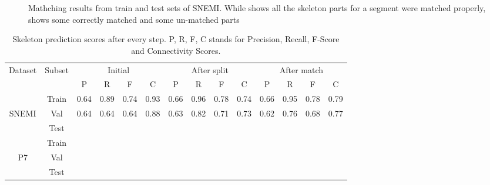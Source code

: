\begin{figure}[htpb]
\begin{subfigure}[b]{0.4\textwidth}
		\caption{\label{fig:merged_val}}
	\end{subfigure}	
	\caption{Mathching results from  train and  test sets of SNEMI. While  shows all the skeleton parts for a segment were matched properly,  shows some correctly matched and some un-matched parts}  
	\label{fig:matchedSNEMI}
\end{figure}

\begin{table}[!ht]                                                                                          
	\centering
	\begin{adjustbox}{width=\textwidth,center=\textwidth}
	\begin{tabular}{|c|c|c|c|c|c|c|c|c|c|c|c|c|c|}                                                                      
		\hline                                                                                               
		\multirow{2}{*}{Dataset} & \multirow{2}{*}{Subset} & \multicolumn{4}{c|}{Initial}  & \multicolumn{4}{c|}{After split}  & \multicolumn{4}{c|}{After match} \\                                    
		\cline{3-14}                                                                                                  
		&  & P & R & F & C & P & R & F & C & P & R & F & C \\                                                           
		\hline                                                                                                  
		\hline                                                                                                  
				& Train & 0.64 & 0.89 & 0.74 & 0.93 & 0.66 & 0.96 & 0.78 & 0.74 & 0.66 & 0.95 & 0.78  & 0.79\\                           
		SNEMI 	& Val 	& 0.64 & 0.64 & 0.64 & 0.88 & 0.63 & 0.82 & 0.71 & 0.73 & 0.62 & 0.76 & 0.68 & 0.77 \\           
				& Test 	&  &  &  &  &  &  &  &  &  &  &  & \\
		\hline		 
				& Train &  &  &  &  &  &  &  &  &  &  &  & \\                           
		P7 		& Val 	&  &  &  &  &  &  &  &  &  &  &  & \\           
				& Test 	&  &  &  &  &  &  &  &  &  &  &  & \\                          
		\hline                                                                                                     
	\end{tabular}
	\end{adjustbox}                                                
	\caption{Skeleton prediction scores after every step. P, R, F, C stands for Precision, Recall, F-Score and Connectivity Scores.}
	\label{tab:dissected_scores}                                                                   
\end{table}
